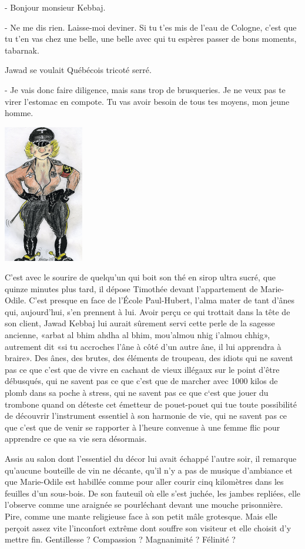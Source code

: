 - Bonjour monsieur Kebbaj.

- Ne me dis rien. Laisse-moi deviner. Si tu t’es mis de l’eau de Cologne, c’est que tu t’en vas chez une belle, une belle avec qui tu espères passer de bons moments, tabarnak.

Jawad se voulait Québécois tricoté serré.

- Je vais donc faire diligence, mais sans trop de brusqueries. Je ne veux pas te virer l’estomac en compote. Tu vas avoir besoin de tous tes moyens, mon jeune homme.

\begin{floatingfigure}[l]{40mm}
\includegraphics[height=60mm]{corps/chapitre12/img/personnage-marie-odile-ilsa.jpg}
\end{floatingfigure}

C’est avec le sourire de quelqu’un qui boit son thé en sirop ultra sucré, que quinze minutes plus tard, il dépose Timothée devant l’appartement de Marie-Odile. C’est presque en face de l’École Paul-Hubert, l’alma mater de tant d’ânes qui, aujourd’hui, s’en prennent à lui. Avoir perçu ce qui trottait dans la tête de son client, Jawad Kebbaj lui aurait sûrement servi cette perle de la sagesse ancienne, «arbat al bhim ahdha al bhim, mou’almou nhig i’almou chhig», autrement dit «si tu accroches l’âne à côté d’un autre âne, il lui apprendra à braire». Des ânes, des brutes, des éléments de troupeau, des idiots qui ne savent pas ce que c’est que de vivre en cachant de vieux illégaux sur le point d’être débusqués, qui ne savent pas ce que c’est que de marcher avec 1000 kilos de plomb dans sa poche à stress, qui ne savent pas ce que c‘est que jouer du trombone quand on déteste cet émetteur de pouet-pouet qui tue toute possibilité de découvrir l’instrument essentiel à son harmonie de vie, qui ne savent pas ce que c’est que de venir se rapporter à l’heure convenue à une femme flic pour apprendre ce que sa vie sera désormais.

Assis au salon dont l’essentiel du décor lui avait échappé l’autre soir, il remarque qu’aucune bouteille de vin ne décante, qu’il n’y a pas de musique d’ambiance et que Marie-Odile est habillée comme pour aller courir cinq kilomètres dans les feuilles d’un sous-bois. De son fauteuil où elle s’est juchée, les jambes repliées, elle l’observe comme une araignée se pourléchant devant une mouche prisonnière. Pire, comme une mante religieuse face à son petit mâle grotesque. Mais elle perçoit assez vite l’inconfort extrême dont souffre son visiteur et elle choisit d’y mettre fin. Gentillesse ? Compassion ? Magnanimité ? Félinité ?

